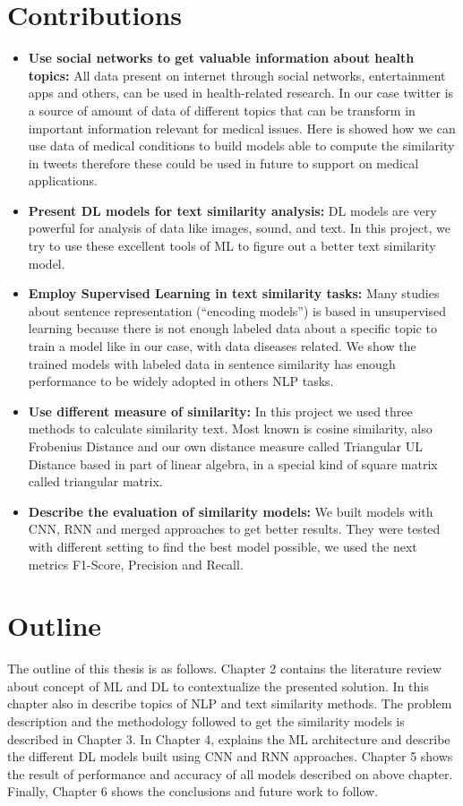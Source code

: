 \documentclass[12pt]{report}
\begin{document}
\section{Contributions}
\begin{itemize}[nolistsep]
	\item \textbf{Use social networks to get valuable information about health topics:} All data present on internet through social networks, entertainment apps and others, can be used in health-related research. In our case twitter is a source of amount of data of different topics that can be transform in important information relevant for medical issues. Here is showed how we can use data of medical conditions to build models able to compute the similarity in tweets therefore these could be used in future to support on medical applications. 
	\item \textbf{Present \ac{DL} models for text similarity analysis:} \ac{DL} models are very powerful for analysis of data like images, sound, and text. In this project, we try to use these excellent tools of \ac{ML} to figure out a better text similarity model.
	\item \textbf{Employ Supervised Learning in text similarity tasks:} Many studies about sentence representation (``encoding models'') is based in unsupervised learning because there is not enough labeled data about a specific topic to train a model like in our case, with data diseases related. We show the trained models with labeled data in sentence similarity has enough performance to be widely adopted in others \ac{NLP} tasks.
	\item \textbf{Use different measure of similarity:} In this project we used three methods to calculate similarity text. Most known is cosine similarity, also Frobenius Distance and our own distance measure called Triangular UL Distance based in part of linear algebra, in a special kind of square matrix called triangular matrix.
	\item \textbf{Describe the evaluation of similarity models: } We built models with \ac{CNN}, \ac{RNN} and merged approaches to get better results. They were tested with different setting to find the best model possible, we used the next metrics F1-Score, Precision and Recall.
\end{itemize}

\section{Outline}
The outline of this thesis is as follows. Chapter 2 contains the literature review about concept of \ac{ML} and \ac{DL} to contextualize the presented solution. In this chapter also in describe topics of \ac{NLP} and text similarity methods. The problem description and the methodology followed to get the similarity models is described in Chapter 3. In Chapter 4, explains the \ac{ML} architecture and describe the different \ac{DL} models built using \ac{CNN} and \ac{RNN} approaches. Chapter 5 shows the result of performance and accuracy of all models described on above chapter. Finally, Chapter 6 shows the conclusions and future work to follow.
\end{document}
